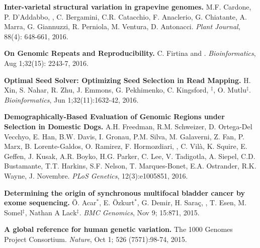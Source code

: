   \vspace{-.2cm}        
  {\bf Inter-varietal structural variation in grapevine genomes.}
 M.F. Cardone, P. D'Addabbo, \calkan{}, C. Bergamini, C.R. Catacchio, F. Anaclerio, G. Chiatante, A. Marra, G. Giannuzzi, R. Perniola, M. Ventura, D. Antonacci.
 {\em Plant Journal}, 88(4): 648-661, 2016.

  \vspace{-.2cm}        
  {\bf On Genomic Repeats and Reproducibility.}
  C. Firtina and \calkan{}.
 {\em Bioinformatics}, Aug 1;32(15): 2243-7, 2016.

  \vspace{-.2cm}        
  {\bf Optimal Seed Solver: Optimizing Seed Selection in Read Mapping.}
  H. Xin, S. Nahar, R. Zhu, J. Emmons, G. Pekhimenko, C. Kingsford, \calkan{}$^\ddag$, O. Mutlu$^\ddag$.
 {\em Bioinformatics}, Jun 1;32(11):1632-42, 2016.

  \vspace{-.2cm}        
  {\bf Demographically-Based Evaluation of Genomic Regions under Selection in Domestic Dogs.}
A.H. Freedman, R.M. Schweizer, D. Ortega-Del Vecchyo, E. Han, B.W. Davis, I. Gronau, P.M. Silva, M. Galaverni, Z. Fan, P. Marx, B. Lorente-Galdos, O. Ramirez, F. Hormozdiari, \calkan{}, C. Vilà, K. Squire, 
E. Geffen, J. Kusak, A.R. Boyko, H.G. Parker, C. Lee, V. Tadigotla, A. Siepel, C.D. Bustamante, T.T. Harkins, S.F. Nelson, T. Marques-Bonet, E.A. Ostrander, R.K. Wayne, J. Novembre.
 {\em PLoS Genetics}, 12(3):e1005851, 2016.

  \vspace{-.2cm}        
  {\bf Determining the origin of synchronous multifocal bladder cancer by exome sequencing.} 
  Ö. Acar$^*$, E. Özkurt$^*$, G. Demir, H. Saraç, \calkan{}, T. Esen, M. Somel$^\ddag$, Nathan A Lack$^\ddag$.
 {\em BMC Genomics}, Nov 9; 15:871, 2015.

  \vspace{-.2cm}        
  {\bf A global reference for human genetic variation.} The 1000 Genomes Project Consortium.  {\em Nature}, Oct 1; 526 (7571):98-74, 2015.

